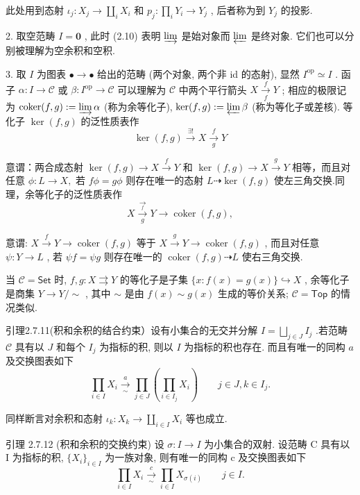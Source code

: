 \documentclass[]{article}
\begin{document}
此处用到态射 $\iota_{j}: X_{j} \to \coprod_{i} X_{i}$ 和 $p_{j}: \prod_{i} Y_{i} \to Y_{j}$ , 后者称为到 $Y_{j}$ 的投影. 

2. 取空范畴 $I = \mathbf{0}$ , 此时 (2.10) 表明 $\varinjlim$ 是始对象而 $\varprojlim$ 是终对象. 它们也可以分别被理解为空余积和空积. 

3. 取 $I$ 为图表 $\bullet \longrightarrow \bullet$ 给出的范畴 (两个对象, 两个非 id 的态射), 显然 $I^{\mathrm{op}} \simeq I$ . 函子 $\alpha: I \to \mathcal{C}$ 或 $\beta: I^{\mathrm{op}} \to \mathcal{C}$ 可以理解为 $\mathcal{C}$ 中两个平行箭头 $X \xrightarrow[f]{f} Y$ ; 相应的极限记为 $\operatorname{coker}(f, g) := \varinjlim \alpha$ (称为余等化子), $\ker(f, g) := \varprojlim \beta$ (称为等化子或差核). 等化子 $\ker(f, g)$ 的泛性质表作 $$
\ker (f, g) \xrightarrow {\exists !} X \xrightarrow [ g ]{f} Y 
$$

意谓：两合成态射 $\ker (f,g)\to X\xrightarrow{f}Y$ 和 $\ker (f,g)\to X\xrightarrow{g}Y$ 相等，而且对任意 $\phi :L\to X,$ 若 $f\phi = g\phi$ 则存在唯一的态射 $L\dashrightarrow \ker (f,g)$ 使左三角交换.同理，余等化子的泛性质表作 $$
X \xrightarrow [ g ]{\underset {f} {\longrightarrow}} Y \xrightarrow {} \operatorname{coker} (f, g), 
$$

意谓: $X \xrightarrow{f} Y \to \operatorname{coker}(f, g)$ 等于 $X \xrightarrow{g} Y \to \operatorname{coker}(f, g)$ , 而且对任意 $\psi : Y \to L$ , 若 $\psi f = \psi g$ 则存在唯一的 $\operatorname{coker}(f, g) \dashrightarrow L$ 使右三角交换. 

当 $\mathcal{C} = \mathsf{Set}$ 时, $f, g: X \rightrightarrows Y$ 的等化子是子集 $\{x: f(x) = g(x)\} \hookrightarrow X$ , 余等化子是商集 $Y \to Y / \sim$ , 其中 $\sim$ 是由 $f(x) \sim g(x)$ 生成的等价关系; $\mathcal{C} = \mathsf{Top}$ 的情况类似. 

引理2.7.11(积和余积的结合约束）设有小集合的无交并分解 $I = \bigsqcup_{j\in J}I_j$ .若范畴 $\mathcal{C}$ 具有以 $J$ 和每个 $I_{j}$ 为指标的积, 则以 $I$ 为指标的积也存在. 而且有唯一的同构 $a$ 及交换图表如下$$
\prod_ {i \in I} X _ {i} \xrightarrow [ \sim ]{a} \prod_ {j \in J} \left(\prod_ {i \in I _ {j}} X _ {i}\right) \qquad j \in J,   k \in I _ {j}.
$$

同样断言对余积和态射 $\iota_{k}:X_{k}\to \coprod_{i\in I}X_{i}$ 等也成立. 

引理 2.7.12 (积和余积的交换约束) 设 $\sigma: I \rightarrow I$ 为小集合的双射. 设范畴 C 具有以 I 为指标的积, $\{X_{i}\}_{i \in I}$ 为一族对象, 则有唯一的同构 c 及交换图表如下 $$
\prod_ {i \in I} X _ {i} \xrightarrow [ \sim ]{c} \prod_ {i \in I} X _ {\sigma (i)} \qquad j \in I.
$$
\end{document}

